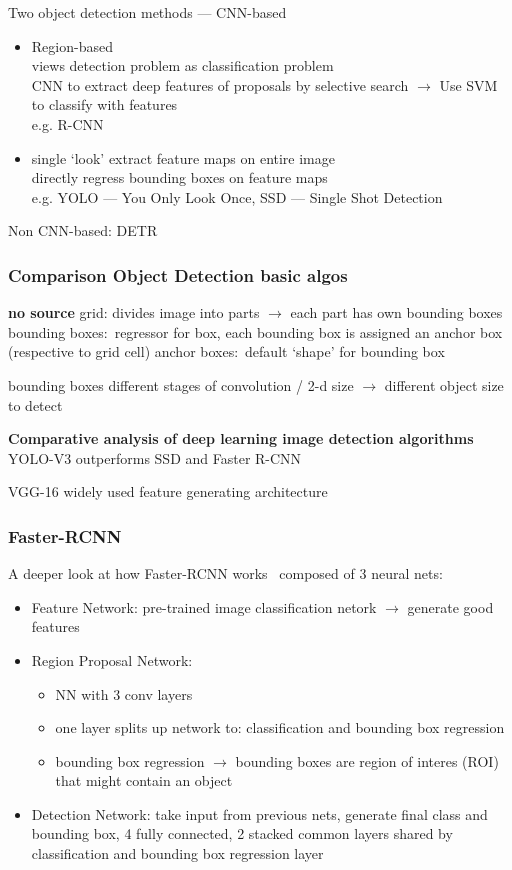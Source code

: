 Two object detection methods --- CNN-based
\begin{itemize}
    \item Region-based \\
        views detection problem as classification problem\\
        CNN to extract deep features of proposals by selective search $\rightarrow$  Use SVM to
            classify with features\\
        e.g. R-CNN
    \item  single `look'
        extract feature maps on entire image\\
        directly regress bounding boxes on feature maps\\
        e.g. YOLO --- You Only Look Once, SSD --- Single Shot Detection
\end{itemize}
Non CNN-based: DETR

\subsubsection*{Comparison Object Detection basic algos}

\textbf{no source}
grid: divides image into parts $\rightarrow$ each part has own bounding boxes
bounding boxes:~regressor for box, each bounding box is assigned an anchor box (respective to grid cell)
anchor boxes:~default `shape' for bounding box

bounding boxes different stages of convolution / 2-d size $\rightarrow$ different object size to detect

\textbf{Comparative analysis of deep learning image detection
algorithms}~\citep{srivastava_comparative_2021}
YOLO-V3 outperforms SSD and Faster R-CNN

VGG-16 widely used feature generating architecture

\subsubsection*{Faster-RCNN}
A deeper look at how Faster-RCNN works~\citep{goswami_deeper_2018}
composed of 3 neural nets:
\begin{itemize}
    \item Feature Network: pre-trained image classification netork $\rightarrow$ generate good features
    \item Region Proposal Network:
        \begin{itemize}
            \item NN with 3 conv layers
            \item one layer splits up network to: classification and bounding box regression
            \item bounding box regression $\rightarrow$ bounding boxes are region of interes (ROI)
                that might contain an object
        \end{itemize}
    \item Detection Network: take input from previous nets, generate final class and bounding box,
        4 fully connected, 2 stacked common layers shared by classification and bounding box regression
        layer \end{itemize}


